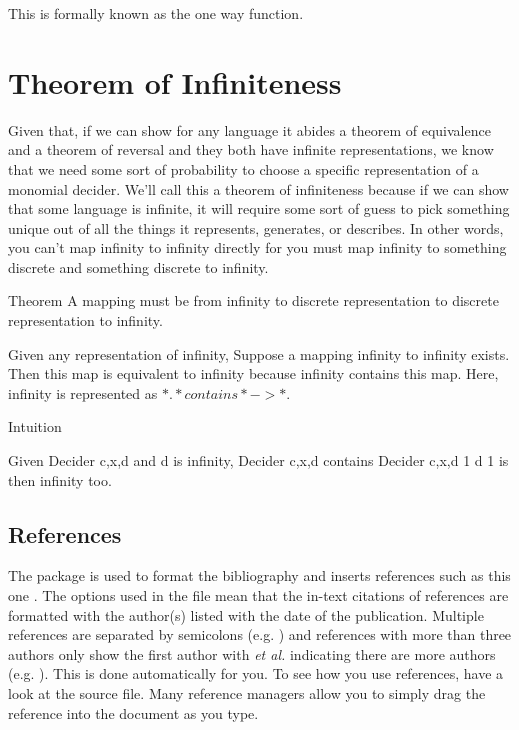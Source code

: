 This is formally known as the one way function.

\section{Theorem of Infiniteness}

Given that, if we can show for any language it abides a theorem of equivalence and a theorem of reversal and they both have infinite representations, we know that we need some sort of probability to choose a specific representation of a monomial decider. We'll call this a theorem of infiniteness because if we can show that some language is infinite, it will require some sort of guess to pick something unique out of all the things it represents, generates, or describes. In other words, you can't map infinity to infinity directly for you must map infinity to something discrete and something discrete to infinity.

Theorem
A mapping must be from infinity to discrete representation to discrete representation to infinity.

Given any representation of infinity,
Suppose a mapping infinity to infinity exists.
Then this map is equivalent to infinity because 
infinity contains this map.
Here, infinity is represented as $\ast. \ast contains \ast -> \ast.$

Intuition

Given Decider c,x,d and d is infinity,
Decider c,x,d contains Decider c,x,d 1
d 1 is then infinity too.


\subsection{References}

The  package is used to format the bibliography and inserts references such as this one \parencite{Reference1}. The options used in the  file mean that the in-text citations of references are formatted with the author(s) listed with the date of the publication. Multiple references are separated by semicolons (e.g. \parencite{Reference2, Reference1}) and references with more than three authors only show the first author with \emph{et al.} indicating there are more authors (e.g. \parencite{Reference3}). This is done automatically for you. To see how you use references, have a look at the  source file. Many reference managers allow you to simply drag the reference into the document as you type.

